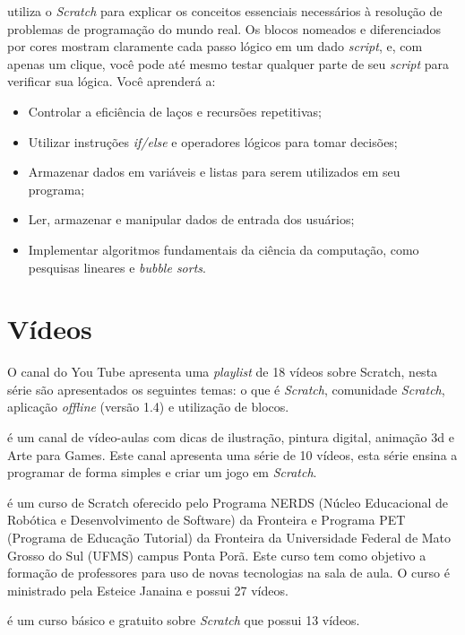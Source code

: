 \documentclass[12pt,fleqn]{book} %
\begin{document}
\textcite{marji2014aprenda} utiliza o \textit{Scratch} para explicar os conceitos essenciais necessários à resolução de problemas de programação do mundo real. Os blocos nomeados e diferenciados por cores mostram claramente cada passo lógico em um dado \textit{script}, e, com apenas um clique, você pode até mesmo testar qualquer parte de seu \textit{script} para verificar sua lógica. Você aprenderá a:

\begin{itemize}
	\item Controlar a eficiência de laços e recursões repetitivas;
	\item Utilizar instruções \textit{if/else} e operadores lógicos para tomar decisões;
	\item Armazenar dados em variáveis e listas para serem utilizados em seu programa;
	
	\item Ler, armazenar e manipular dados de entrada dos usuários;
	\item Implementar algoritmos fundamentais da ciência da computação, como pesquisas lineares e \textit{bubble sorts}.
\end{itemize}

\section{Vídeos}

O canal do You Tube \textcite{apensarem2018} apresenta uma \textit{playlist} de 18 vídeos sobre Scratch, nesta série são apresentados os seguintes temas: o que é \textit{Scratch}, comunidade \textit{Scratch}, aplicação \textit{offline} (versão 1.4) e utilização de blocos.
	
\textcite{ilustradicas2018} é um canal de vídeo-aulas com dicas de ilustração, pintura digital, animação 3d e Arte para Games. Este canal apresenta uma série de 10 vídeos, esta série ensina a programar de forma simples e criar um jogo em \textit{Scratch}. 
	
\textcite{cursocompleto2018} é um curso de Scratch oferecido pelo Programa NERDS (Núcleo Educacional de Robótica e Desenvolvimento de Software) da Fronteira e Programa PET (Programa de Educação Tutorial) da Fronteira da Universidade Federal de Mato Grosso do Sul (UFMS) campus Ponta Porã. Este curso tem como objetivo a formação de professores para uso de novas tecnologias na sala de aula. O curso é ministrado pela Esteice Janaina e possui 27 vídeos.
	
\textcite{cursoexcel2018} é um curso básico e gratuito sobre \textit{Scratch} que possui 13 vídeos. 
	
\end{document}
